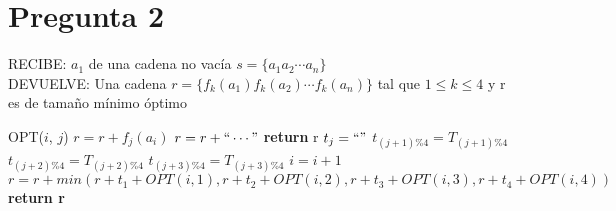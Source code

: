 \documentclass{article}
\begin{document}

    
\section*{Pregunta 2}

\vspace{0.5cm}

\noindent RECIBE: $a_{1}$ de una cadena no vacía $s=\{a_1a_2\cdots a_n\}$ \\
DEVUELVE: Una cadena $r=\{f_k(a_1)f_k(a_2)\cdots f_k(a_n)\}$ tal que $1 \leq k \leq 4$ y r es
de tamaño mínimo óptimo
\begin{algorithmic}[1]
\item[]{OPT($i$, $j$)}
\State $r=r+f_j(a_i)$
\Else 
\State $r=r+``\cdots"$
\EndIf
{}
\State \textbf{return} r
\EndIf
\State $t_j = ``"$
\State $t_{(j+1)\%4} = T_{(j+1)\%4}$
\State $t_{(j+2)\%4} = T_{(j+2)\%4}$
\State $t_{(j+3)\%4} = T_{(j+3)\%4}$
\State $i = i+1$
\State $r=r+min(r+t_1+OPT(i,1),r+t_2+OPT(i,2),
r+t_3+OPT(i,3), r+t_4+OPT(i,4))$
\State \textbf{return r} 
\end{algorithmic}
\end{document}
